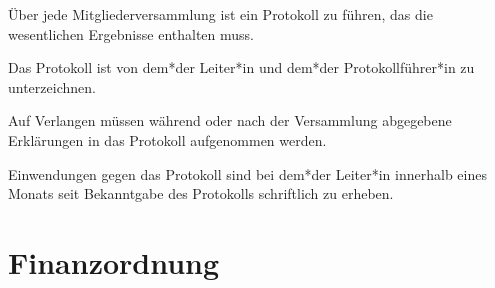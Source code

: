 \begin{gfmitglieder}

  Über jede Mitgliederversammlung ist ein Protokoll zu führen, das die wesentlichen Ergebnisse enthalten muss.

  Das Protokoll ist von dem*der Leiter*in und dem*der Protokollführer*in zu unterzeichnen.

  Auf Verlangen müssen während oder nach der Versammlung abgegebene Erklärungen in das Protokoll aufgenommen werden.

  Einwendungen gegen das Protokoll sind bei dem*der Leiter*in innerhalb eines Monats seit Bekanntgabe des Protokolls schriftlich zu erheben.

\end{gfmitglieder}

\section{Finanzordnung}

